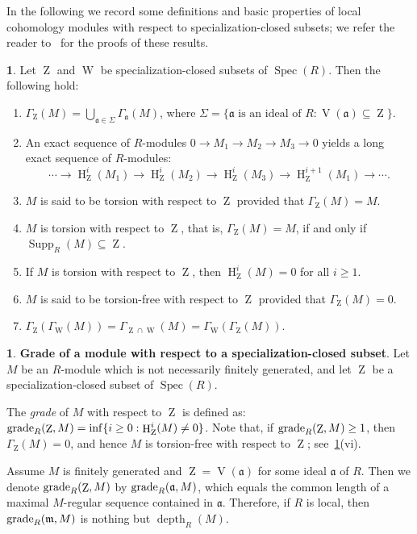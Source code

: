 \documentclass[11pt]{amsart}
\theoremstyle{definition}
\theoremstyle{definition}
\newtheorem{chunk}[thm]{\hspace*{-1.065ex}\bf}
\numberwithin{equation}{section}
\newcommand{\fm}{\mathfrak{m}}
\newcommand{\fa}{\mathfrak{a}}
\DeclareMathOperator{\gr}{\textnormal{grade}}
\DeclareMathOperator{\V}{V}
\DeclareMathOperator{\mz}{Z}
\DeclareMathOperator{\mw}{W}
\DeclareMathOperator{\depth}{depth}
\DeclareMathOperator{\hh}{H}
\DeclareMathOperator{\Supp}{Supp}
\DeclareMathOperator{\Spec}{Spec}
\begin{document}
In the following we record some definitions and basic properties of local cohomology modules with respect to specialization-closed subsets; we refer the reader to~\cite{Bsh,sga2} for the proofs of these results.

\begin{chunk} \label{LC} Let $\mz$ and $\mw$ be specialization-closed subsets of $\Spec(R)$. Then the following hold:
\begin{enumerate}[\rm(i)]
\item $\Gamma_{\mz}(M)=\bigcup_{\fa\in\Sigma}\Gamma_{\fa}(M)$, where $\Sigma=\{\fa \text{ is an ideal of } R : \V(\fa)\subseteq\mz\}$. 
\item An exact sequence of $R$-modules $0\to M_1\to M_2\to M_3\to 0$ yields a long exact sequence of $R$-modules: $$\cdots\to \hh^i_{\mz}(M_1)\to \hh^i_{\mz}(M_2)\to \hh^i_{\mz}(M_3)\to \hh^{i+1}_{\mz}(M_1)\to \cdots.$$ 
\item $M$ is said to be torsion with respect to $\mz$ provided that $\Gamma_{\mz}(M)=M$.
\item $M$ is torsion with respect to $\mz$, that is, $\Gamma_{\mz}(M)=M$, if and only if $\Supp_R(M)\subseteq\mz$. 
\item If $M$ is torsion with respect to $\mz$, then $\hh^i_{\mz}(M)=0$ for all $i\geq 1$.
\item $M$ is said to be torsion-free with respect to $\mz$ provided that $\Gamma_{\mz}(M)=0$.
\item $\Gamma_{\mz}\left(\Gamma_{\mw}(M)\right)=\Gamma_{\mz\cap \mw}(M)=\Gamma_{\mw}\left(\Gamma_{\mz}(M)\right)$. 
\end{enumerate}	
\end{chunk}


\begin{chunk}\label{gsc} \textbf{Grade of a module with respect to a specialization-closed subset}. Let $M$ be an $R$-module which is not necessarily finitely generated, and let $\mz$ be a specialization-closed subset of $\Spec(R)$. 

The {\em  grade} of $M$ with respect to $\mz$ is defined as:
$\gr_R(\mz,M)=\inf\{i \geq 0: \hh_{\mz}^{i}(M)\neq0\}$. Note that, if $\gr_R(\mz,M)\geq 1$, then $\Gamma_{\mz}(M)=0$, and hence $M$ is torsion-free with respect to $\mz$; see~\ref{LC}(vi). 	

Assume $M$ is finitely generated and $\mz=\V(\fa)$ for some ideal $\fa$ of $R$. Then we denote $\gr_R(\mz,M)$ by $\gr_R(\fa,M)$, which equals the common length of a maximal $M$-regular sequence contained in $\fa$. Therefore, if $R$ is local, then $\gr_R(\fm,M)$ is nothing but $\depth_R(M)$.
\end{chunk}
\end{document}
